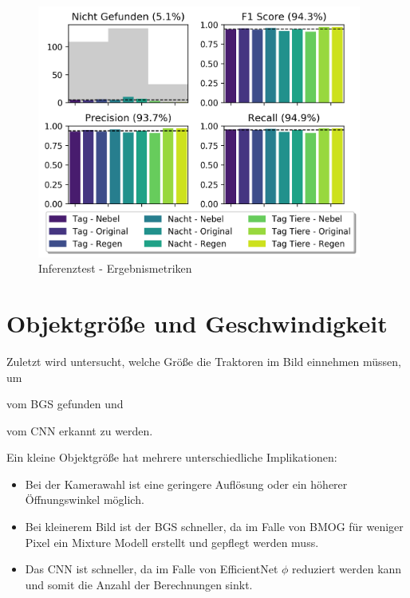 \begin{figure}[H]
    \begin{small}
        \begin{center}
            \includegraphics[width=0.95\textwidth]{figures/chapter_6/inference-metrics}
        \end{center}
        \caption[Inferenztest - Ergebnismetriken]
        {Inferenztest - Ergebnismetriken}
        \label{ch6:fig:inf_metrics}
    \end{small}
\end{figure}


\section{Objektgröße und Geschwindigkeit} \label{ch6:scale}
Zuletzt wird untersucht, welche Größe die Traktoren im Bild einnehmen müssen, um
\begin{enumerate*}[(\arabic*)]
    \item vom \ac{BGS} gefunden und
    \item vom \ac{CNN} erkannt zu werden.
\end{enumerate*}

Ein kleine Objektgröße hat mehrere unterschiedliche Implikationen:
\begin{itemize}
    \item Bei der Kamerawahl ist eine geringere Auflösung oder ein höherer Öffnungswinkel möglich.
    \item Bei kleinerem Bild ist der \ac{BGS} schneller, da im Falle von \ac{BMOG} für weniger Pixel ein Mixture Modell erstellt und gepflegt werden muss.
    \item Das \ac{CNN} ist schneller, da im Falle von EfficientNet $\phi$ reduziert werden kann und somit die Anzahl der Berechnungen sinkt.
\end{itemize}


